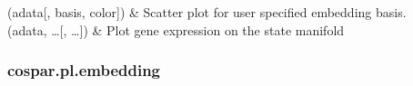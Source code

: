 \documentclass[letterpaper,10pt,english]{sphinxmanual}
\begin{document}
\begin{savenotes}\sphinxatlongtablestart\begin{longtable}[c]{}
\hline

\endfirsthead

%
{}\\
\hline

\endhead

\hline
{}\\
\endfoot

\endlastfoot

{\hyperref[\detokenize{cospar.pl.embedding:cospar.pl.embedding}]{}}(adata{[}, basis, color{]})
&
Scatter plot for user specified embedding basis.
\\
\hline
{\hyperref[\detokenize{cospar.pl.gene_expression_on_manifold:cospar.pl.gene_expression_on_manifold}]{}}(adata, …{[}, …{]})
&
Plot gene expression on the state manifold
\\
\hline
\end{longtable}\sphinxatlongtableend\end{savenotes}


\subsubsection{cospar.pl.embedding}
\label{\detokenize{cospar.pl.embedding:cospar-pl-embedding}}\label{\detokenize{cospar.pl.embedding::doc}}
\end{document}
